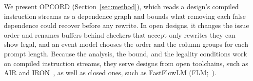 We present OPCORD (Section~\ref{sec:method}), which reads a design's compiled instruction streams as a dependence graph and bounds what removing each false dependence could recover before any rewrite.
In open designs, it changes the issue order and renames buffers behind checkers that accept only rewrites they can show legal, and an event model chooses the order and the column groups for each prompt length.
Because the analysis, the bound, and the legality conditions work on compiled instruction streams, they serve designs from open toolchains, such as AIR and IRON~\citep{hunhoff2025iron}, as well as closed ones, such as FastFlowLM (FLM;~\citealp{fastflowlm-repo}).
